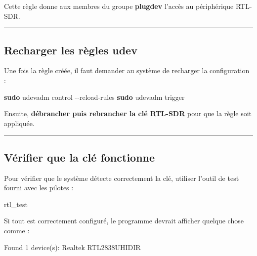 \documentclass[
  french,
]{article}
\newenvironment{Shaded}{\begin{snugshade}}{\end{snugshade}}
\newcommand{\AttributeTok}[1]{\textcolor[rgb]{0.13,0.29,0.53}{#1}}
\newcommand{\ExtensionTok}[1]{#1}
\newcommand{\FunctionTok}[1]{\textcolor[rgb]{0.13,0.29,0.53}{\textbf{#1}}}
\newcommand{\NormalTok}[1]{#1}
\begin{document}
Cette règle donne aux membres du groupe \textbf{plugdev} l'accès au
périphérique RTL-SDR.

\begin{center}\rule{0.5\linewidth}{0.5pt}\end{center}

\subsection{Recharger les règles
udev}\label{recharger-les-ruxe8gles-udev}

Une fois la règle créée, il faut demander au système de recharger la
configuration :

\begin{Shaded}
\begin{Highlighting}[]
\FunctionTok{sudo}\NormalTok{ udevadm control }\AttributeTok{{-}{-}reload{-}rules}
\FunctionTok{sudo}\NormalTok{ udevadm trigger}
\end{Highlighting}
\end{Shaded}

Ensuite, \textbf{débrancher puis rebrancher la clé RTL-SDR} pour que la
règle soit appliquée.

\begin{center}\rule{0.5\linewidth}{0.5pt}\end{center}

\subsection{Vérifier que la clé
fonctionne}\label{vuxe9rifier-que-la-cluxe9-fonctionne}

Pour vérifier que le système détecte correctement la clé, utiliser
l'outil de test fourni avec les pilotes :

\begin{Shaded}
\begin{Highlighting}[]
\ExtensionTok{rtl\_test}
\end{Highlighting}
\end{Shaded}

Si tout est correctement configuré, le programme devrait afficher
quelque chose comme :

\begin{Shaded}
\begin{Highlighting}[]
\NormalTok{Found 1 device(s):}
\NormalTok{Realtek RTL2838UHIDIR}
\end{Highlighting}
\end{Shaded}
\end{document}
